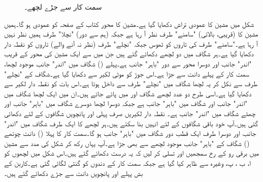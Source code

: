 \begin{figure}
\caption{سمت کار سے جڑے لچھے۔}
\label{شکل_یکسمتی_سمتکار_سے_جڑے_لچھے}
\end{figure}


شکل  میں مشین کا عمودی تراش دکھایا گیا ہے۔مشین کا محور کتاب کے صفحہ کو عمودی ہو گا۔ہمیں مشین کا (قریبی، بالائی) "سامنے" طرف نظر آ رہا ہے جبکہ  (ہم سے دور) "نچلا"  طرف ہمیں نظر نہیں آ رہا ہے۔"سامنے" طرف کی تاروں کو ٹھوس جبکہ "نچلے" طرف (نظر نہ آنے والے) تاروں کو نقطہ دار دکھایا گیا ہے۔ہر شگاف میں دو لچھے دکھائے گئے ہیں جن میں سے ایک مشین کی محور کے قریب  "اندر" جانب اور دوسرا محور سے دور "باہر" جانب ہے۔پہلے () شگاف میں "اندر" جانب موجود لچھا، سمت کار کے پہلے دانت سے جڑا ہے۔اس جوڑ کو موٹی لکیر سے دکھایا گیا ہے۔شگاف  کے "نچلے" طرف سے نکل کر یہ لچھا  شگاف  میں "نچلے" طرف سے داخل ہوتا ہے۔اس بات کو نقطہ دار لکیر سے دکھایا گیا ہے۔اسی طرح دو عدد لچھے شگاف  اور  میں پائے جاتے ہیں۔ان میں ایک لچھا  شگاف   میں "اندر" جانب اور شگاف  میں "باہر" جانب ہے جبکہ دوسرا لچھا دوسرے شگاف میں "باہر"  جانب اور چھٹے شگاف میں "اندر" جانب ہے۔ نقطہ دار لکیریں صرف پہلی اور پانچویں شگافوں کے لئے دکھائی گئی ہیں۔آپ خود باقی شگافوں کے لئے انہیں بنا سکتے ہیں۔ہر لچھے کا ایک طرف شگاف میں "اندر" جانب  اور  دوسرا طرف ایک قطب دور  شگاف میں "باہر" جانب  ہو گا۔سمت کار کا  پہلا () دانت چوتھے () شگاف کے "باہر" جانب موجود لچھے سے بھی جڑا ہے۔آپ یہاں رکھ کر شکل   کی مدد سے مشین میں برقی رو کے رخ سمجھیں اور تسلی کر لیں کہ یہ درست دکھائے گئے ہیں۔اس شکل میں لچھوں کو ا، ب ، پ، وغیرہ سے ظاہر کیا گیا ہے جبکہ سمت کار کے دندوں کو گنتی لگائی گئی ہے۔کاربن کے بش پہلے اور پانچویں دانت سے جڑے دکھائے گئے ہیں۔

